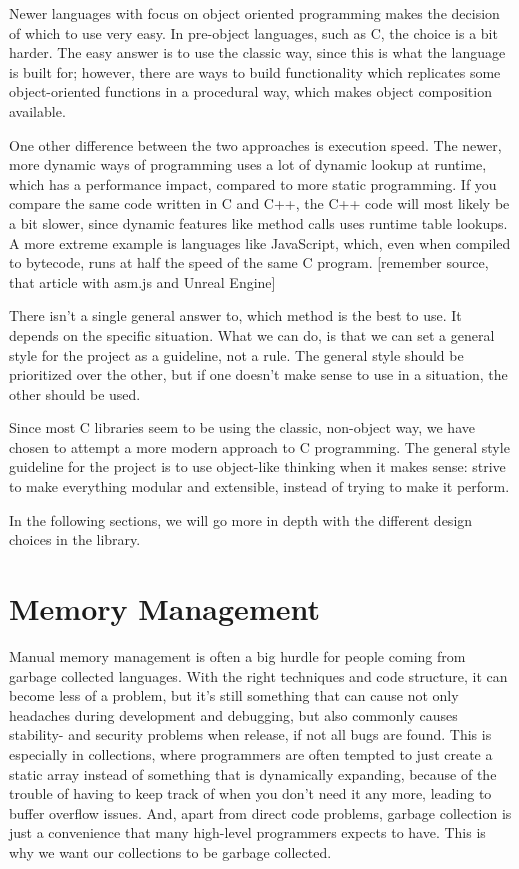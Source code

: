 \documentclass[table]{ituthesis}
\begin{document}
Newer languages with focus on object oriented programming makes the decision of which to use very easy. In pre-object languages, such as C, the choice is a bit harder. The easy answer is to use the classic way, since this is what the language is built for; however, there are ways to build functionality which replicates some object-oriented functions in a procedural way, which makes object composition available.

One other difference between the two approaches is execution speed. The newer, more dynamic ways of programming uses a lot of dynamic lookup at runtime, which has a performance impact, compared to more static programming. If you compare the same code written in C and C++, the C++ code will most likely be a bit slower, since dynamic features like method calls uses runtime table lookups. A more extreme example is languages like JavaScript, which, even when compiled to bytecode, runs at half the speed of the same C program. [remember source, that article with asm.js and Unreal Engine]

There isn't a single general answer to, which method is the best to use. It depends on the specific situation. What we can do, is that we can set a general style for the project as a guideline, not a rule. The general style should be prioritized over the other, but if one doesn't make sense to use in a situation, the other should be used.

Since most C libraries seem to be using the classic, non-object way, we have chosen to attempt a more modern approach to C programming. The general style guideline for the project is to use object-like thinking when it makes sense: strive to make everything modular and extensible, instead of trying to make it perform.

In the following sections, we will go more in depth with the different design choices in the library.

\section{Memory Management}\label{sec:arch_memory_management}

Manual memory management is often a big hurdle for people coming from garbage collected languages. With the right techniques and code structure, it can become less of a problem, but it's still something that can cause not only headaches during development and debugging, but also commonly causes stability- and security problems when release, if not all bugs are found. This is especially in collections, where programmers are often tempted to just create a static array instead of something that is dynamically expanding, because of the trouble of having to keep track of when you don't need it any more, leading to buffer overflow issues. And, apart from direct code problems, garbage collection is just a convenience that many high-level programmers expects to have. This is why we want our collections to be garbage collected.
\end{document}
